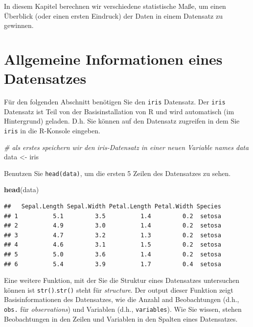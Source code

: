 \documentclass[
  ngerman,
]{book}
\newenvironment{Shaded}{\begin{snugshade}}{\end{snugshade}}
\newcommand{\CommentTok}[1]{\textcolor[rgb]{0.56,0.35,0.01}{\textit{#1}}}
\newcommand{\FunctionTok}[1]{\textcolor[rgb]{0.13,0.29,0.53}{\textbf{#1}}}
\newcommand{\NormalTok}[1]{#1}
\newcommand{\OtherTok}[1]{\textcolor[rgb]{0.56,0.35,0.01}{#1}}
\begin{document}
In diesem Kapitel berechnen wir verschiedene statistische Maße, um einen Überblick (oder einen ersten Eindruck)
der Daten in einem Datensatz zu gewinnen.

\section{Allgemeine Informationen eines Datensatzes}\label{allgemeine-informationen-eines-datensatzes}

Für den folgenden Abschnitt benötigen Sie den \texttt{iris} Datensatz. Der \texttt{iris} Datensatz ist
Teil von der Basisinstallation von R und wird automatisch (im Hintergrund) geladen. D.h. Sie
können auf den Datensatz zugreifen in dem Sie \texttt{iris} in die R-Konsole eingeben.

\begin{Shaded}
\begin{Highlighting}[]
\CommentTok{\# als erstes speichern wir den iris{-}Datensatz in einer neuen Variable names \textquotesingle{}data\textquotesingle{}}
\NormalTok{data }\OtherTok{\textless{}{-}}\NormalTok{ iris}
\end{Highlighting}
\end{Shaded}

Benutzen Sie \texttt{head(data)}, um die ersten 5 Zeilen des Datensatzes zu sehen.

\begin{Shaded}
\begin{Highlighting}[]
\FunctionTok{head}\NormalTok{(data)}
\end{Highlighting}
\end{Shaded}

\begin{verbatim}
##   Sepal.Length Sepal.Width Petal.Length Petal.Width Species
## 1          5.1         3.5          1.4         0.2  setosa
## 2          4.9         3.0          1.4         0.2  setosa
## 3          4.7         3.2          1.3         0.2  setosa
## 4          4.6         3.1          1.5         0.2  setosa
## 5          5.0         3.6          1.4         0.2  setosa
## 6          5.4         3.9          1.7         0.4  setosa
\end{verbatim}

Eine weitere Funktion, mit der Sie die Struktur eines Datensatzes untersuchen können
ist \texttt{str()}.\texttt{str()} steht für \emph{structure}. Der output dieser Funktion zeigt Basisinformationen des
Datensatzes, wie die Anzahl and Beobachtungen (d.h., \texttt{obs.} für \emph{observations}) und
Variablen (d.h., \texttt{variables}). Wie Sie wissen, stehen Beobachtungen in den Zeilen und Variablen in den
Spalten eines Datensatzes.
\end{document}
